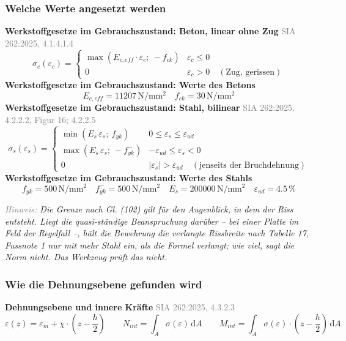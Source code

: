 \documentclass[11pt,a4paper]{article}
\newcommand{\normref}[1]{{\small\textcolor{gray}{#1}}}
\newcommand{\hinweis}[2]{\par\noindent\textcolor{gray}{\textit{#1:}} \textit{#2}\par}
\begin{document}
\subsubsection{Welche Werte angesetzt werden}
\noindent\textbf{Werkstoffgesetze im Gebrauchszustand: Beton, linear ohne Zug} \hfill \normref{SIA 262:2025, 4.1.4.1.4}
\begin{equation*}
\sigma_c(\varepsilon_c) = \begin{cases} \max\left(E_{c,eff} \cdot \varepsilon_c;\ -f_{ck}\right) & \varepsilon_c \le 0 \\[1ex] 0 & \varepsilon_c > 0 \quad (\text{Zug, gerissen}) \end{cases}
\end{equation*}
\noindent\textbf{Werkstoffgesetze im Gebrauchszustand: Werte des Betons}
\begin{equation*}
E_{c,eff} = 11207\,\mathrm{N}/\mathrm{mm}^{2} \quad f_{ck} = 30\,\mathrm{N}/\mathrm{mm}^{2}
\end{equation*}
\noindent\textbf{Werkstoffgesetze im Gebrauchszustand: Stahl, bilinear} \hfill \normref{SIA 262:2025, 4.2.2.2, Figur 16; 4.2.2.5}
\begin{equation*}
\sigma_s(\varepsilon_s) = \begin{cases} \min(E_s\,\varepsilon_s;\ f_{yk}) & 0 \le \varepsilon_s \le \varepsilon_{ud} \\[1ex] \max(E_s\,\varepsilon_s;\ -f_{yk}^{-}) & -\varepsilon_{ud} \le \varepsilon_s < 0 \\[1ex] 0 & |\varepsilon_s| > \varepsilon_{ud} \quad (\text{jenseits der Bruchdehnung}) \end{cases}
\end{equation*}
\noindent\textbf{Werkstoffgesetze im Gebrauchszustand: Werte des Stahls}
\begin{equation*}
f_{yk} = 500\,\mathrm{N}/\mathrm{mm}^{2} \quad f_{yk}^{-} = 500\,\mathrm{N}/\mathrm{mm}^{2} \quad E_s = 200000\,\mathrm{N}/\mathrm{mm}^{2} \quad \varepsilon_{ud} = 4.5\,\%
\end{equation*}
\hinweis{Hinweis}{Die Grenze nach Gl. (102) gilt für den Augenblick, in dem der Riss entsteht. Liegt die quasi-ständige Beanspruchung darüber – bei einer Platte im Feld der Regelfall –, hält die Bewehrung die verlangte Rissbreite nach Tabelle 17, Fussnote 1 nur mit mehr Stahl ein, als die Formel verlangt; wie viel, sagt die Norm nicht. Das Werkzeug prüft das nicht.}
\subsubsection{Wie die Dehnungsebene gefunden wird}
\noindent\textbf{Dehnungsebene und innere Kräfte} \hfill \normref{SIA 262:2025, 4.3.2.3}
\begin{equation*}
\varepsilon(z) = \varepsilon_m + \chi \cdot \left(z - \frac{h}{2}\right) \qquad N_{int} = \int_A \sigma\left(\varepsilon\right)\,\mathrm{d}A \qquad M_{int} = \int_A \sigma\left(\varepsilon\right) \cdot \left(z - \frac{h}{2}\right)\,\mathrm{d}A
\end{equation*}
\end{document}
